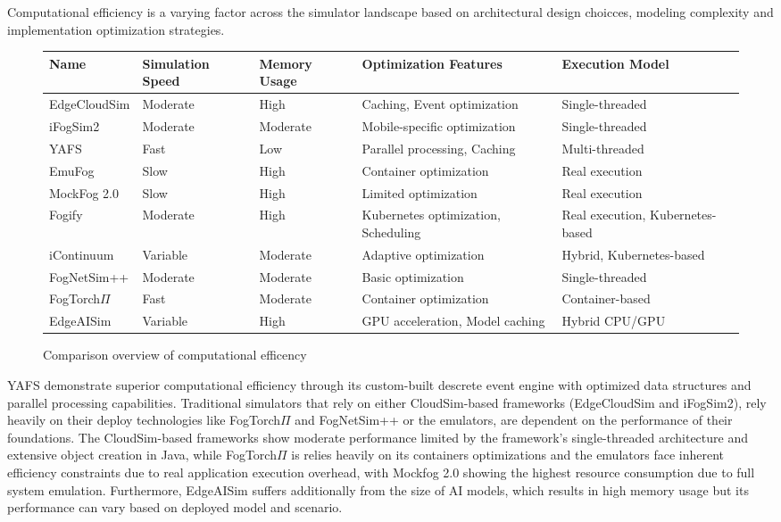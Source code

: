 Computational efficiency is a varying factor across the simulator landscape based on architectural design choicces, modeling complexity and implementation optimization strategies.
\begin{figure}[H]
  \centering
  \begin{tabularx}{\textwidth}{ l | X | X | X | X }
    \hline
    \textbf{Name} & \textbf{Simulation Speed} & \textbf{Memory Usage} & \textbf{Optimization Features} & \textbf{Execution Model}\\
    \hline\hline
    EdgeCloudSim  & Moderate  & High      & Caching, Event optimization         & Single-threaded \\\hline
    iFogSim2      & Moderate  & Moderate  & Mobile-specific optimization        & Single-threaded \\\hline
    YAFS          & Fast      & Low       & Parallel processing, Caching        & Multi-threaded \\\hline
    EmuFog        & Slow      & High      & Container optimization              & Real execution \\\hline
    MockFog 2.0   & Slow      & High      & Limited optimization                & Real execution \\\hline
    Fogify        & Moderate  & High      & Kubernetes optimization, Scheduling & Real execution, Kubernetes-based \\\hline
    iContinuum    & Variable  & Moderate  & Adaptive optimization               & Hybrid, Kubernetes-based \\\hline
    FogNetSim++   & Moderate  & Moderate  & Basic optimization                  & Single-threaded \\\hline
    FogTorch$\Pi$ & Fast      & Moderate  & Container optimization              & Container-based \\\hline
    EdgeAISim     & Variable  & High      & GPU acceleration, Model caching     & Hybrid CPU/GPU \\\hline
  \end{tabularx}
  \caption{Comparison overview of computational efficency}
  \label{tab:analysis-performance}
\end{figure}
YAFS demonstrate superior computational efficiency through its custom-built descrete event engine with optimized data structures and parallel processing capabilities.
Traditional simulators that rely on either CloudSim-based frameworks (EdgeCloudSim and iFogSim2), rely heavily on their deploy technologies like FogTorch$\Pi$ and FogNetSim++ or the emulators, are dependent on the performance of their foundations.
The CloudSim-based frameworks show moderate performance limited by the framework's single-threaded architecture and extensive object creation in Java,
while FogTorch$\Pi$ is relies heavily on its containers optimizations and the emulators face inherent efficiency constraints due to real application execution overhead, with Mockfog 2.0 showing the highest resource consumption due to full system emulation.
Furthermore, EdgeAISim suffers additionally from the size of AI models, which results in high memory usage but its performance can vary based on deployed model and scenario.

